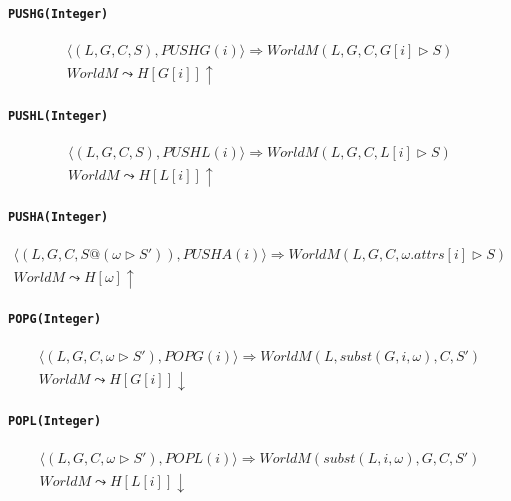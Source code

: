 \documentclass[]{article}
\numberwithin{equation}{section}
\numberwithin{figure}{section}
\numberwithin{table}{section}
\begin{document}
\paragraph{\texttt{PUSHG(Integer)}}\label{pushginteger}

\begin{gather*}
  \langle (L, G, C, S), PUSHG(i)\rangle \Rightarrow WorldM (L, G, C, G[i] \rhd S )\\
  WorldM \leadsto H[G[i]] \uparrow
\end{gather*}

\paragraph{\texttt{PUSHL(Integer)}}\label{pushlinteger}

\begin{gather*}
  \langle (L, G, C, S), PUSHL(i)\rangle \Rightarrow WorldM (L, G, C, L[i] \rhd S )\\
  WorldM \leadsto H[L[i]] \uparrow
\end{gather*}

\paragraph{\texttt{PUSHA(Integer)}}\label{pushainteger}

\begin{gather*}
  \langle (L, G, C, S@(\omega \rhd S')), PUSHA(i)\rangle \Rightarrow WorldM (L, G, C, \omega.attrs[i] \rhd S )\\
  WorldM \leadsto H[\omega] \uparrow
\end{gather*}

\paragraph{\texttt{POPG(Integer)}}\label{popginteger}

\begin{gather*}
  \langle (L, G, C, \omega \rhd S'), POPG(i)\rangle \Rightarrow WorldM (L, subst(G, i, \omega), C, S' )\\
  WorldM \leadsto H[G[i]] \downarrow
\end{gather*}

\paragraph{\texttt{POPL(Integer)}}\label{poplinteger}

\begin{gather*}
  \langle (L, G, C, \omega \rhd S'), POPL(i)\rangle \Rightarrow WorldM (subst(L, i, \omega), G, C, S' )\\
  WorldM \leadsto H[L[i]] \downarrow
\end{gather*}
\end{document}
